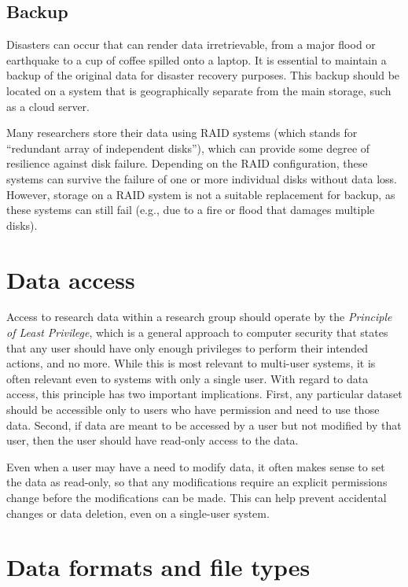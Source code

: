 \subsection{Backup}

Disasters can occur that can render data irretrievable, from a major flood or earthquake to a cup of coffee spilled onto a laptop.  It is essential to maintain a backup of the original data for disaster recovery purposes.  This backup should be located on a system that is geographically separate from the main storage, such as a cloud server.

Many researchers store their data using RAID systems (which stands for ``redundant array of independent disks''), which can provide some degree of resilience against disk failure.  Depending on the RAID configuration, these systems can survive the failure of one or more individual disks without data loss. However, storage on a RAID system is not a suitable replacement for backup, as these systems can still fail (e.g., due to a fire or flood that damages multiple disks).

\section{Data access}

Access to research data within a research group should operate by the \textit{Principle of Least Privilege}, which is a general approach to computer security that states that any user should have only enough privileges to perform their intended actions, and no more. While this is most relevant to multi-user systems, it is often relevant even to systems with only a single user. With regard to data access, this principle has two important implications.  First, any particular dataset should be accessible only to users who have permission and need to use those data. Second, if data are meant to be accessed by a user but not modified by that user, then the user should have read-only access to the data.

Even when a user may have a need to modify data, it often makes sense to set the data as read-only, so that any modifications require an explicit permissions change before the modifications can be made. This can help prevent accidental changes or data deletion, even on a single-user system.

\section{Data formats and file types}

